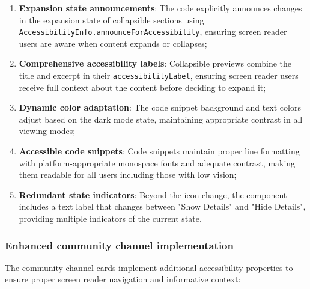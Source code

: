 \begin{enumerate}
    \item \textbf{Expansion state announcements}: The code explicitly announces changes in the expansion state of collapsible sections using \texttt{AccessibilityInfo.announceForAccessibility}, ensuring screen reader users are aware when content expands or collapses;
    
    \item \textbf{Comprehensive accessibility labels}: Collapsible previews combine the title and excerpt in their \texttt{accessibilityLabel}, ensuring screen reader users receive full context about the content before deciding to expand it;
    
    \item \textbf{Dynamic color adaptation}: The code snippet background and text colors adjust based on the dark mode state, maintaining appropriate contrast in all viewing modes;
    
    \item \textbf{Accessible code snippets}: Code snippets maintain proper line formatting with platform-appropriate monospace fonts and adequate contrast, making them readable for all users including those with low vision;
    
    \item \textbf{Redundant state indicators}: Beyond the icon change, the component includes a text label that changes between "Show Details" and "Hide Details", providing multiple indicators of the current state.
\end{enumerate}

\subsubsection{Enhanced community channel implementation}
\label{subsubsec:instruction-channel-implementation}

The community channel cards implement additional accessibility properties to ensure proper screen reader navigation and informative context:

